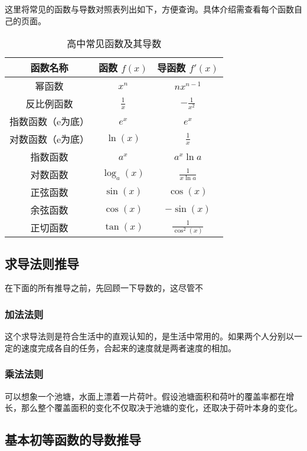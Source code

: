 \begin{example}{}

\end{example}


这里将常见的函数与导数对照表列出如下，方便查询。具体介绍需查看每个函数自己的页面。

\begin{table}[ht]
\centering
\caption{高中常见函数及其导数}\label{tab_HsDerB2}
\begin{tabular}{|c|c|c|}
\hline
\textbf{函数名称}     & \textbf{函数 $f(x)$}     & \textbf{导函数 $f'(x)$}     \\ \hline
幂函数&$x^n$                    & $n x^{n-1}$                \\ \hline
反比例函数&$\displaystyle\frac{1}{x}$             & $\displaystyle-\frac{1}{x^2}$           \\ \hline
指数函数（e为底）&$e^x$                     & $e^x$                      \\ \hline
对数函数（e为底）&$\ln(x)$                  & $\displaystyle\frac{1}{x}$              \\ \hline
指数函数&$a^x$                     & $a^x\ln a $                      \\ \hline
对数函数&$\log_a(x)$                  & $\displaystyle \frac{1}{x\ln a}$              \\ \hline
正弦函数&$\sin(x)$                 & $\cos(x)$                  \\ \hline
余弦函数&$\cos(x)$                 & $-\sin(x)$                 \\ \hline
正切函数&$\tan(x)$                 & $\displaystyle \frac{1}{\cos^2(x)}$                \\ \hline
\end{tabular}
\end{table}

\subsection{求导法则推导}

在下面的所有推导之前，先回顾一下导数的，这尽管不


\subsubsection{加法法则}

这个求导法则是符合生活中的直观认知的，是生活中常用的。如果两个人分别以一定的速度完成各自的任务，合起来的速度就是两者速度的相加。

\subsubsection{乘法法则}
可以想象一个池塘，水面上漂着一片荷叶。假设池塘面积和荷叶的覆盖率都在增长，那么整个覆盖面积的变化不仅取决于池塘的变化，还取决于荷叶本身的变化。

\subsection{基本初等函数的导数推导}

